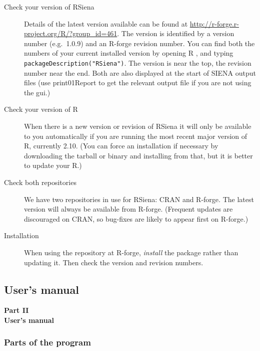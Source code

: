 \documentclass[a4paper,fleqn]{article}
\newcommand{\+}{\, + \,}
\newcommand{\sfn}[1]{\textsf{#1}}
\newcommand{\R}{{\sf R }}
\newcommand{\Rn}{{\sf R}}
\newcommand{\rs}{{\sf RSiena}}
\newcommand{\RS}{{\sf RSiena }}
\newcommand{\SI}{{\sf SIENA }}
\begin{document}
{\begin{description}
\item[Check your version of \RS] Details of the latest version available can
  be found at \url{http://r-forge.r-project.org/R/?group_id=461}. The version is
  identified by a version number (e.g.\ 1.0.9) and an R-forge revision
  number. You can find both the numbers of your current installed version by
  opening \R, and typing \verb|packageDescription("RSiena")|. The version is
  near the top, the revision number near the end. Both are also displayed at the
  start of \SI output files (use \sfn{print01Report} to get the relevant output
  file if you are not using the gui.)
\item[Check your version of \Rn] When there is a new version or revision of \RS
  it will only be available to you automatically if you are running the most
  recent major version of \Rn, currently 2.10. (You can force an installation if
  necessary by downloading the tarball or binary and installing from that, but
  it is better to update your \Rn.)
\item [Check both repositories] We have two repositories in use for \rs: CRAN
  and R-forge. The latest version will always be available from
  R-forge. (Frequent updates are discouraged on CRAN, so bug-fixes are likely to
  appear first on R-forge.)
\item[Installation] When using the repository at R-forge, \emph{install} the
  package rather than updating it. Then check the version and revision numbers.
\end{description}


\newpage
\begin{print}
\part{User's manual}
\end{print}
\begin{screen}
{\color{section0}\LARGE\bf\noindent
Part II\\[1.5ex] User's manual\\[1.8ex]}
\end{screen}


\begin{print}
\end{print}

\section[Program parts]{Parts of the program}
\label{S_parts}

}
\end{document}
